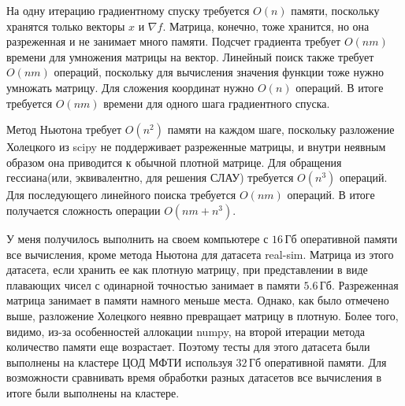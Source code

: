 \documentclass[notitlepage]{article}
\begin{document}
На одну итерацию градиентному спуску требуется $O(n)$ памяти, поскольку хранятся только векторы $x$ и $\nabla f$. 
Матрица, конечно, тоже хранится, но она разреженная и не занимает много памяти.
Подсчет градиента требует $O(nm)$ времени для умножения матрицы на вектор.
Линейный поиск также требует $O(nm)$ операций, поскольку для вычисления значения функции тоже нужно умножать матрицу.
Для сложения координат нужно $O(n)$ операций. В итоге требуется $O(nm)$ времени для одного шага градиентного спуска.

Метод Ньютона требует $O(n^2)$ памяти на каждом шаге, поскольку разложение Холецкого из scipy не поддерживает разреженные
матрицы, и внутри неявным образом она приводится к обычной плотной матрице.
Для обращения гессиана(или, эквивалентно, для решения СЛАУ) требуется $O(n^3)$ операций.
Для последующего линейного поиска требуется $O(nm)$ операций. В итоге получается сложность операции $O(nm + n^3)$.

У меня получилось выполнить на своем компьютере с $16$\,Гб оперативной памяти все вычисления, кроме метода Ньютона для
датасета real-sim.
Матрица из этого датасета, если хранить ее как плотную матрицу,
при представлении в виде плавающих чисел с одинарной точностью занимает в памяти $5.6$\,Гб.
Разреженная матрица занимает в памяти намного меньше места.
Однако, как было отмечено выше, разложение Холецкого неявно превращает матрицу в плотную.
Более того, видимо, из-за особенностей аллокации numpy, на второй итерации метода количество памяти еще возрастает.
Поэтому тесты для этого датасета были выполнены на кластере ЦОД МФТИ используя $32$\,Гб оперативной памяти.
Для возможности сравнивать время обработки разных датасетов все вычисления в итоге были выполнены на кластере.
\end{document}
